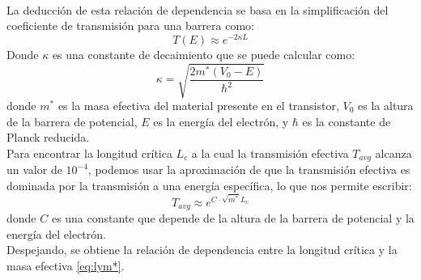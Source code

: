 \paragraph{}
La deducción de esta relación de dependencia se basa en la simplificación del
coeficiente de transmisión para una barrera como:
\begin{equation}
    \label{eq:tunneling}
    T(E) \approx e^{-2\kappa L}
\end{equation}
Donde $\kappa$ es una constante de decaimiento que se puede calcular como:
\begin{equation}
    \label{eq:kappa}
    \kappa = \sqrt{\frac{2m^*(V_0 - E)}{\hbar^2}}
\end{equation}
donde $m^*$ es la masa efectiva del material presente en el transistor, $V_0$ es la altura de la barrera de potencial, $E$ es la energía del electrón, y $\hbar$ es la constante de Planck reducida.\\
Para encontrar la longitud crítica $L_c$ a la cual la transmisión efectiva $T_{avg}$ alcanza un valor de $10^{-4}$, podemos usar la aproximación de que la transmisión efectiva es dominada por la transmisión a una energía específica, lo que nos permite escribir:
\begin{equation}
    \label{eq:tavg_approx}
    T_{avg} \approx e^{C\cdot \sqrt{m^*} L_c}
\end{equation}
donde $C$ es una constante que depende de la altura de la barrera de potencial y la energía del electrón.\\
Despejando, se obtiene la relación de dependencia entre la longitud crítica y la masa efectiva \eqref{eq:lym*}.




